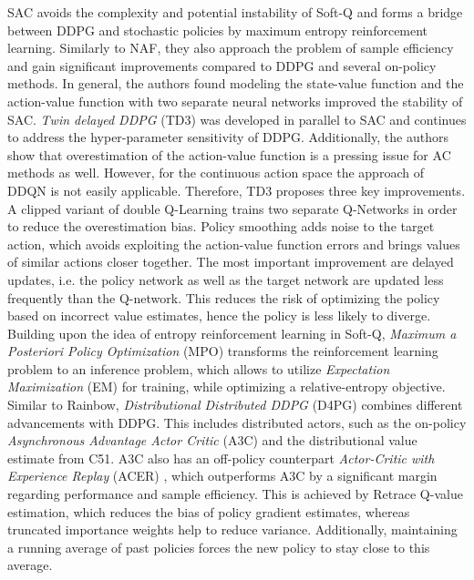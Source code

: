 	SAC avoids the complexity and potential instability of Soft-Q and forms a bridge between DDPG and stochastic policies by maximum entropy reinforcement learning.
	Similarly to NAF, they also approach the problem of sample efficiency and gain significant improvements compared to DDPG and several on-policy methods.
	In general, the authors found modeling the state-value function and the action-value function with two separate neural networks improved the stability of SAC. 
	\textit{Twin delayed DDPG} (TD3) \cite{Fujimoto2018} was developed in parallel to SAC and continues to address the hyper-parameter sensitivity of DDPG.
	Additionally, the authors show that overestimation of the action-value function is a pressing issue for AC methods as well. 
	However, for the continuous action space the approach of DDQN is not easily applicable.
	Therefore, TD3 proposes three key improvements.
	A clipped variant of double Q-Learning trains two separate Q-Networks in order to reduce the overestimation bias.
	Policy smoothing adds noise to the target action, which avoids exploiting the action-value function errors and brings values of similar actions closer together.
	The most important improvement are delayed updates, i.e. the policy network as well as the target network are updated less frequently than the Q-network.
	This reduces the risk of optimizing the policy based on incorrect value estimates, hence the policy is less likely to diverge.\\
	Building upon the idea of entropy reinforcement learning in Soft-Q, \textit{Maximum a Posteriori Policy Optimization} (MPO) \cite{Abdolmaleki2018} transforms the reinforcement learning problem to an inference problem, which allows to utilize \textit{Expectation Maximization} (EM) for training, while optimizing a relative-entropy objective.
	Similar to Rainbow, \textit{Distributional Distributed DDPG} (D4PG) \cite{Barth-Maron2018} combines different advancements with DDPG.
	This includes distributed actors, such as the on-policy \textit{Asynchronous Advantage Actor Critic} (A3C) \cite{Mnih2016} and the distributional value estimate from C51.
	A3C also has an off-policy counterpart \textit{Actor-Critic with Experience Replay} (ACER) \cite{Wang2017}, which outperforms A3C by a significant margin regarding performance and sample efficiency. 
	This is achieved by Retrace \cite{Munos2016} Q-value estimation, which reduces the bias of policy gradient estimates, whereas truncated importance weights help to reduce variance.
	Additionally, maintaining a running average of past policies forces the new policy to stay close to this average.

